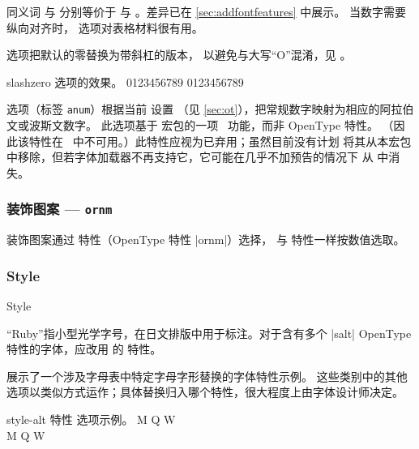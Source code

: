 \documentclass[a4paper]{l3doc}
\begin{document}
同义词  与  分别等价于
 与 。差异已在 \vref{sec:addfontfeatures} 中展示。
当数字需要纵向对齐时， 选项对表格材料很有用。

 选项把默认的零替换为带斜杠的版本，
以避免与大写“O”混淆，见 。

\begin{Lexample}{slashzero}{ 选项的效果。}
   0123456789
   0123456789
\end{Lexample}

 选项（标签 \verb|anum|）根据当前  设置
（见 \vref{sec:ot}），把常规数字映射为相应的阿拉伯文或波斯文数字。
此选项基于  宏包的一项 \LuaTeX\ 功能，而非 OpenType 特性。
（因此该特性在 \XeTeX\ 中不可用。）此特性应视为已弃用；虽然目前没有计划
将其从本宏包中移除，但若字体加载器不再支持它，它可能在几乎不加预告的情况下
从  中消失。


\subsubsection{装饰图案 --- \texttt{ornm}}

装饰图案通过  特性（OpenType 特性 |ornm|）选择，
与  特性一样按数值选取。


\subsubsection{Style}
\label{sec:ot-feat-style}

\begin{features}{Style}
\end{features}

“Ruby”指小型光学字号，在日文排版中用于标注。对于含有多个 |salt|
OpenType 特性的字体，应改用  的  特性。

 展示了一个涉及字母表中特定字母字形替换的字体特性示例。
这些类别中的其他选项以类似方式运作；具体替换归入哪个特性，很大程度上由字体设计师决定。

 \begin{Xexample}[firstline=2]{style-alt}{ 特性  选项示例。}
  \Large
   M Q W                      \\
   M Q W
\end{Xexample}
\end{document}
